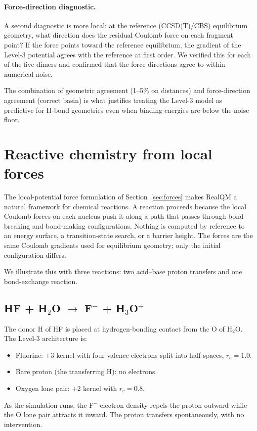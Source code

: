 \paragraph{Force-direction diagnostic.}
A second diagnostic is more local: at the reference (CCSD(T)/CBS) equilibrium geometry, what direction does the residual Coulomb force on each fragment point? If the force points toward the reference equilibrium, the gradient of the Level-3 potential agrees with the reference at first order. We verified this for each of the five dimers and confirmed that the force directions agree to within numerical noise.

The combination of geometric agreement (1--5\% on distances) and force-direction agreement (correct basin) is what justifies treating the Level-3 model as predictive for H-bond geometries even when binding energies are below the noise floor.

\section{Reactive chemistry from local forces}\label{sec:reactive}

The local-potential force formulation of Section~\ref{sec:forces} makes RealQM a natural framework for chemical reactions. A reaction proceeds because the local Coulomb forces on each nucleus push it along a path that passes through bond-breaking and bond-making configurations. Nothing is computed by reference to an energy surface, a transition-state search, or a barrier height. The forces are the same Coulomb gradients used for equilibrium geometry; only the initial configuration differs.

We illustrate this with three reactions: two acid--base proton transfers and one bond-exchange reaction.

\subsection{HF + H$_2$O $\to$ F$^-$ + H$_3$O$^+$}

The donor H of HF is placed at hydrogen-bonding contact from the O of H$_2$O. The Level-3 architecture is:
\begin{itemize}
\item Fluorine: $+3$ kernel with four valence electrons split into half-spaces, $r_c = 1.0$.
\item Bare proton (the transferring H): no electrons.
\item Oxygen lone pair: $+2$ kernel with $r_c = 0.8$.
\end{itemize}
As the simulation runs, the F$^-$ electron density repels the proton outward while the O lone pair attracts it inward. The proton transfers spontaneously, with no intervention.

